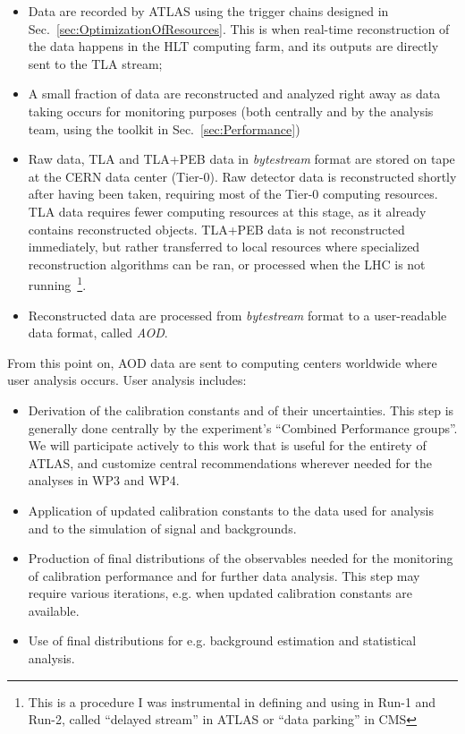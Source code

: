 \begin{itemize}

\item Data are recorded by ATLAS using the trigger chains designed in Sec.~\ref{sec:OptimizationOfResources}. This is when real-time reconstruction of the data happens in the HLT computing farm, and its outputs are directly sent to the TLA stream;
\item A small fraction of data are reconstructed and analyzed right away as data taking occurs for monitoring purposes (both centrally and by the analysis team, using the toolkit in Sec.~\ref{sec:Performance})
\item Raw data, TLA and TLA+PEB data in \textit{bytestream} format are stored on tape at the CERN data center (Tier-0). 
Raw detector data is reconstructed shortly after having been taken, requiring most of the Tier-0 computing resources. 
TLA data requires fewer computing resources at this stage, as it already contains reconstructed objects. 
TLA+PEB data is not reconstructed immediately, but rather transferred to local resources where specialized reconstruction algorithms can be ran, or processed when the LHC is not running~\footnote{This is a procedure I was instrumental in defining and using in Run-1 and Run-2, called “delayed stream” in ATLAS or “data parking” in CMS}. 
\item Reconstructed data are processed from \textit{bytestream} format to a user-readable data format, called \textit{AOD}.  

\end{itemize}

From this point on, AOD data are sent to computing centers worldwide where user analysis occurs. User analysis includes:

\begin{itemize}
\item Derivation of the calibration constants and of their uncertainties. This step is generally done centrally by the experiment’s “Combined Performance groups”. We will participate actively to this work that is useful for the entirety of ATLAS, and customize central recommendations wherever needed for the analyses in WP3 and WP4. 
\item Application of updated calibration constants to the data used for analysis and to the simulation of signal and backgrounds.  
\item Production of final distributions of the observables needed for the monitoring of calibration performance and for further data analysis. This step may require various iterations, e.g. when updated calibration constants are available. 
\item Use of final distributions for e.g. background estimation and statistical analysis.
\end{itemize}

